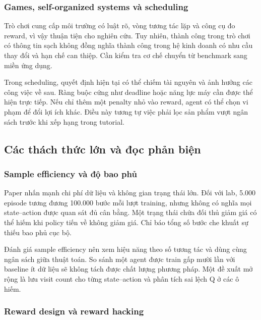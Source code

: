 \subsubsection{Games, self-organized systems và
scheduling}\label{games-self-organized-systems-vuxe0-scheduling}

Trò chơi cung cấp môi trường có luật rõ, vòng tương tác lặp và công cụ
đo reward, vì vậy thuận tiện cho nghiên cứu. Tuy nhiên, thành công trong
trò chơi có thông tin sạch không đồng nghĩa thành công trong hệ kinh
doanh có nhu cầu thay đổi và hạn chế can thiệp. Cần kiểm tra cơ chế
chuyển từ benchmark sang miền ứng dụng.

Trong scheduling, quyết định hiện tại có thể chiếm tài nguyên và ảnh
hưởng các công việc về sau. Ràng buộc cứng như deadline hoặc năng lực
máy cần được thể hiện trực tiếp. Nếu chỉ thêm một penalty nhỏ vào
reward, agent có thể chọn vi phạm để đổi lợi ích khác. Điều này tương tự
việc phải lọc sản phẩm vượt ngân sách trước khi xếp hạng trong tutorial.

\subsection{Các thách thức lớn và đọc phản
biện}\label{cuxe1c-thuxe1ch-thux1ee9c-lux1edbn-vuxe0-ux111ux1ecdc-phux1ea3n-biux1ec7n}

\subsubsection{Sample efficiency và độ bao
phủ}\label{sample-efficiency-vuxe0-ux111ux1ed9-bao-phux1ee7}

Paper nhấn mạnh chi phí dữ liệu và không gian trạng thái lớn. Đối với
lab, 5.000 episode tương đương 100.000 bước mỗi lượt training, nhưng
không có nghĩa mọi state--action được quan sát đủ cân bằng. Một trạng
thái chứa đối thủ giảm giá có thể hiếm khi policy tiến về không giảm
giá. Chỉ báo tổng số bước che khuất sự thiếu bao phủ cục bộ.

Đánh giá sample efficiency nên xem hiệu năng theo số tương tác và dùng
cùng ngân sách giữa thuật toán. So sánh một agent được train gấp mười
lần với baseline ít dữ liệu sẽ không tách được chất lượng phương pháp.
Một đề xuất mở rộng là lưu visit count cho từng state--action và phân
tích sai lệch Q ở các ô hiếm.

\subsubsection{Reward design và reward
hacking}\label{reward-design-vuxe0-reward-hacking}

